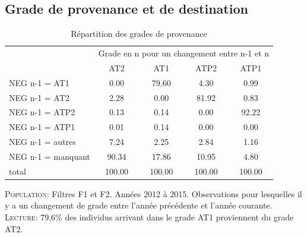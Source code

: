 \documentclass[11pt,a4paper]{article}
\begin{document}
\clearpage
\subsection{Grade de provenance et de destination}



\begin{table}[h!]
\centering
\caption{Répartition des grades de provenance} 
\label{filters}
\begin{tabular}{lcccc}
\toprule
 & \multicolumn{4}{c}{Grade en n pour un changement entre n-1 et n} \\
 & AT2 & AT1 & ATP2 & ATP1 \\ 
  \hline
NEG n-1 = AT1 & 0.00 & 79.60 & 4.30 & 0.99 \\ 
  NEG n-1 = AT2 & 2.28 & 0.00 & 81.92 & 0.83 \\ 
  NEG n-1 = ATP2 & 0.13 & 0.14 & 0.00 & 92.22 \\ 
  NEG n-1 = ATP1 & 0.01 & 0.14 & 0.00 & 0.00 \\ 
  NEG n-1 = autres & 7.24 & 2.25 & 2.84 & 1.16 \\ 
  NEG n-1 = manquant & 90.34 & 17.86 & 10.95 & 4.80 \\ 
  total & 100.00 & 100.00 & 100.00 & 100.00 \\ 
   \hline
\bottomrule
\end{tabular}
\end{table}
\begin{minipage}{12cm}
\footnotesize
\textsc{Population:} Filtres F1 et F2. Années 2012 à 2015. Observations pour lesquelles il y a un changement de grade entre l'année précédente et l'année courante. \\
\textsc{Lecture:} 79,6\% des individus arrivant dans le grade AT1 proviennent du grade AT2.
\end{minipage}
\end{document}
